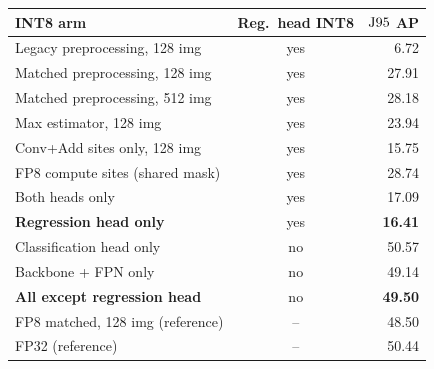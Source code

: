 \begin{tabular}{lcr}
\toprule
INT8 arm & Reg.\ head INT8 & $\mathrm{J95}$ AP \\
\midrule
Legacy preprocessing, 128 img & yes & 6.72 \\
Matched preprocessing, 128 img & yes & 27.91 \\
Matched preprocessing, 512 img & yes & 28.18 \\
Max estimator, 128 img & yes & 23.94 \\
Conv+Add sites only, 128 img & yes & 15.75 \\
FP8 compute sites (shared mask) & yes & 28.74 \\
Both heads only & yes & 17.09 \\
\textbf{Regression head only} & yes & \textbf{16.41} \\
\addlinespace[2pt]
Classification head only & no & 50.57 \\
Backbone + FPN only & no & 49.14 \\
\textbf{All except regression head} & no & \textbf{49.50} \\
\addlinespace[2pt]
FP8 matched, 128 img (reference) & -- & 48.50 \\
FP32 (reference) & -- & 50.44 \\
\bottomrule
\end{tabular}
